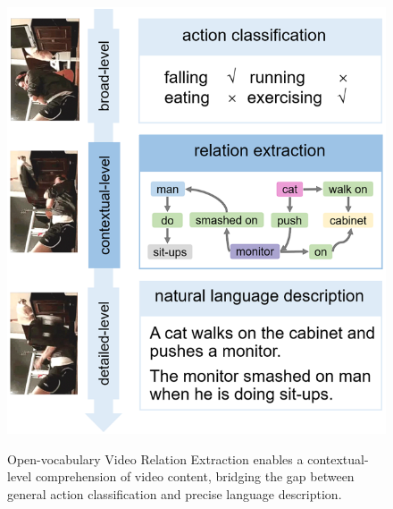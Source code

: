 \documentclass[letterpaper]{article}
\begin{document}

\begin{figure}[t]
  \centering
  \resizebox{0.7\linewidth}{!}
  {\includegraphics{fig/broad2detail1.png}}
  \caption{Open-vocabulary  Video Relation Extraction enables a contextual-level comprehension of video content, bridging the gap between general action classification and precise language description.}
  \label{fig:motivation}
\end{figure}
\end{document}
